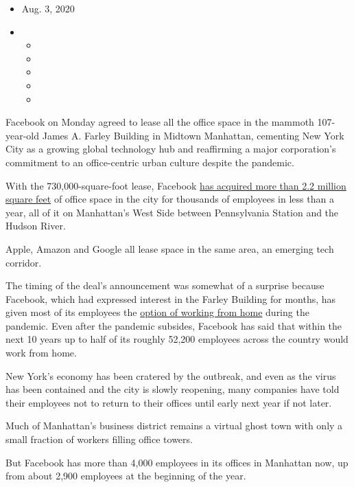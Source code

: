 \begin{itemize}
\item
  Aug. 3, 2020
\item
  \begin{itemize}
  \item
  \item
  \item
  \item
  \item
  \end{itemize}
\end{itemize}

Facebook on Monday agreed to lease all the office space in the mammoth
107-year-old James A. Farley Building in Midtown Manhattan, cementing
New York City as a growing global technology hub and reaffirming a major
corporation's commitment to an office-centric urban culture despite the
pandemic.

With the 730,000-square-foot lease, Facebook
\href{https://www.nytimes.com/2020/01/05/nyregion/nyc-tech-facebook-amazon-google.html}{has
acquired more than 2.2 million square feet} of office space in the city
for thousands of employees in less than a year, all of it on Manhattan's
West Side between Pennsylvania Station and the Hudson River.

Apple, Amazon and Google all lease space in the same area, an emerging
tech corridor.

The timing of the deal's announcement was somewhat of a surprise because
Facebook, which had expressed interest in the Farley Building for
months, has given most of its employees the
\href{https://www.nytimes.com/2020/05/21/technology/facebook-remote-work-coronavirus.html}{option
of working from home} during the pandemic. Even after the pandemic
subsides, Facebook has said that within the next 10 years up to half of
its roughly 52,200 employees across the country would work from home.

New York's economy has been cratered by the outbreak, and even as the
virus has been contained and the city is slowly reopening, many
companies have told their employees not to return to their offices until
early next year if not later.

Much of Manhattan's business district remains a virtual ghost town with
only a small fraction of workers filling office towers.

But Facebook has more than 4,000 employees in its offices in Manhattan
now, up from about 2,900 employees at the beginning of the year.

